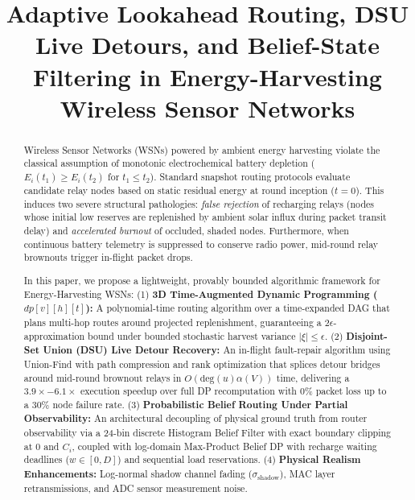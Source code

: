 \documentclass[conference]{IEEEtran}
\begin{document}
\title{Adaptive Lookahead Routing, DSU Live Detours, and Belief-State Filtering in Energy-Harvesting Wireless Sensor Networks}

\author{
}

\maketitle

\begin{abstract}
Wireless Sensor Networks (WSNs) powered by ambient energy harvesting violate the classical assumption of monotonic electrochemical battery depletion ($E_i(t_1) \ge E_i(t_2)$ for $t_1 \le t_2$). Standard snapshot routing protocols evaluate candidate relay nodes based on static residual energy at round inception ($t=0$). This induces two severe structural pathologies: \textit{false rejection} of recharging relays (nodes whose initial low reserves are replenished by ambient solar influx during packet transit delay) and \textit{accelerated burnout} of occluded, shaded nodes. Furthermore, when continuous battery telemetry is suppressed to conserve radio power, mid-round relay brownouts trigger in-flight packet drops.

In this paper, we propose a lightweight, provably bounded algorithmic framework for Energy-Harvesting WSNs:
(1) \textbf{3D Time-Augmented Dynamic Programming ($dp[v][h][t]$):} A polynomial-time routing algorithm over a time-expanded DAG that plans multi-hop routes around projected replenishment, guaranteeing a $2\epsilon$-approximation bound under bounded stochastic harvest variance $|\xi| \le \epsilon$.
(2) \textbf{Disjoint-Set Union (DSU) Live Detour Recovery:} An in-flight fault-repair algorithm using Union-Find with path compression and rank optimization that splices detour bridges around mid-round brownout relays in $O(\text{deg}(u)\alpha(V))$ time, delivering a $3.9\times - 6.1\times$ execution speedup over full DP recomputation with $0\%$ packet loss up to a $30\%$ node failure rate.
(3) \textbf{Probabilistic Belief Routing Under Partial Observability:} An architectural decoupling of physical ground truth from router observability via a 24-bin discrete Histogram Belief Filter with exact boundary clipping at 0 and $C_i$, coupled with log-domain Max-Product Belief DP with recharge waiting deadlines ($w \in [0, D]$) and sequential load reservations.
(4) \textbf{Physical Realism Enhancements:} Log-normal shadow channel fading ($\sigma_{\text{shadow}}$), MAC layer retransmissions, and ADC sensor measurement noise.


\end{abstract}
\end{document}
